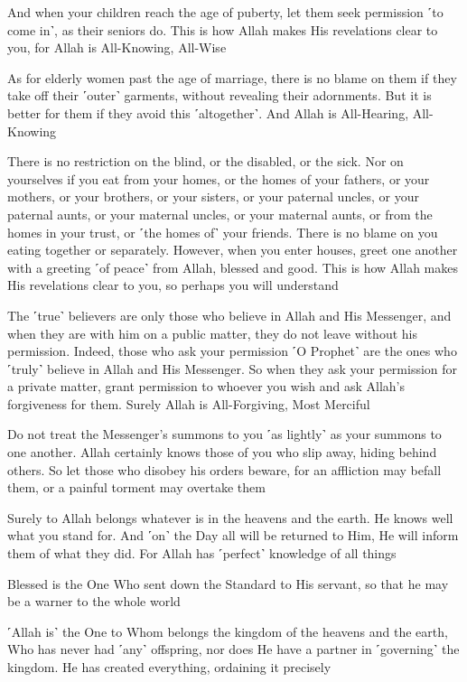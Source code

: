 And when your children reach the age of puberty, let them seek permission ˹to come in˺, as their seniors do. This is how Allah makes His revelations clear to you, for Allah is All-Knowing, All-Wise

As for elderly women past the age of marriage, there is no blame on them if they take off their ˹outer˺ garments, without revealing their adornments. But it is better for them if they avoid this ˹altogether˺. And Allah is All-Hearing, All-Knowing

There is no restriction on the blind, or the disabled, or the sick. Nor on yourselves if you eat from your homes, or the homes of your fathers, or your mothers, or your brothers, or your sisters, or your paternal uncles, or your paternal aunts, or your maternal uncles, or your maternal aunts, or from the homes in your trust, or ˹the homes of˺ your friends. There is no blame on you eating together or separately. However, when you enter houses, greet one another with a greeting ˹of peace˺ from Allah, blessed and good. This is how Allah makes His revelations clear to you, so perhaps you will understand

The ˹true˺ believers are only those who believe in Allah and His Messenger, and when they are with him on a public matter, they do not leave without his permission. Indeed, those who ask your permission ˹O Prophet˺ are the ones who ˹truly˺ believe in Allah and His Messenger. So when they ask your permission for a private matter, grant permission to whoever you wish and ask Allah’s forgiveness for them. Surely Allah is All-Forgiving, Most Merciful

Do not treat the Messenger’s summons to you ˹as lightly˺ as your summons to one another. Allah certainly knows those of you who slip away, hiding behind others. So let those who disobey his orders beware, for an affliction may befall them, or a painful torment may overtake them

Surely to Allah belongs whatever is in the heavens and the earth. He knows well what you stand for. And ˹on˺ the Day all will be returned to Him, He will inform them of what they did. For Allah has ˹perfect˺ knowledge of all things

Blessed is the One Who sent down the Standard to His servant, so that he may be a warner to the whole world

˹Allah is˺ the One to Whom belongs the kingdom of the heavens and the earth, Who has never had ˹any˺ offspring, nor does He have a partner in ˹governing˺ the kingdom. He has created everything, ordaining it precisely

